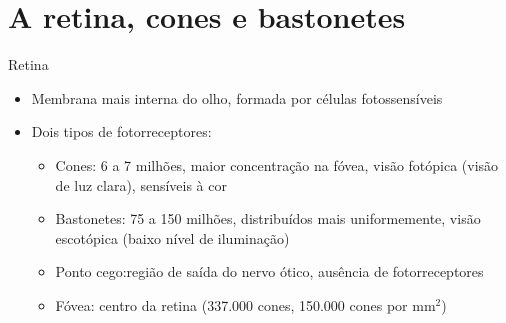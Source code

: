 
   \section[ slide = true]{A retina, cones e bastonetes}
      \begin{slide}[toc=]{Retina}
      \begin{itemize}
         \item Membrana mais interna do olho, formada por células fotossensíveis
         \item Dois tipos de fotorreceptores:
         \begin{itemize}
            \item Cones: 6 a 7 milhões, maior concentração na fóvea, visão fotópica (visão de luz clara),
            sensíveis à cor
            \item Bastonetes: 75 a 150 milhões, distribuídos mais uniformemente, visão escotópica (baixo
            nível de iluminação)
            \item Ponto cego:região de saída do nervo ótico, ausência de fotorreceptores
            \item Fóvea: centro da retina (337.000 cones, 150.000 cones por mm$^2$)
         \end{itemize}
      \end{itemize}
      \end{slide}   

